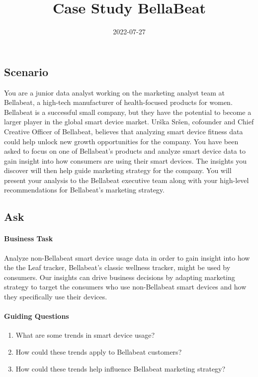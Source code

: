 \documentclass[
]{article}
\title{Case Study BellaBeat}
\author{}
\date{\vspace{-2.5em}2022-07-27}
\providecommand{\tightlist}{%
  \setlength{\itemsep}{0pt}\setlength{\parskip}{0pt}}
\begin{document}
\maketitle

\hypertarget{scenario}{%
\subsection{Scenario}\label{scenario}}

You are a junior data analyst working on the marketing analyst team at
Bellabeat, a high-tech manufacturer of health-focused products for
women. Bellabeat is a successful small company, but they have the
potential to become a larger player in the global smart device market.
Urška Sršen, cofounder and Chief Creative Officer of Bellabeat, believes
that analyzing smart device fitness data could help unlock new growth
opportunities for the company. You have been asked to focus on one of
Bellabeat's products and analyze smart device data to gain insight into
how consumers are using their smart devices. The insights you discover
will then help guide marketing strategy for the company. You will
present your analysis to the Bellabeat executive team along with your
high-level recommendations for Bellabeat's marketing strategy.

\hypertarget{ask}{%
\subsection{Ask}\label{ask}}

\hypertarget{business-task}{%
\paragraph{Business Task}\label{business-task}}

Analyze non-Bellabeat smart device usage data in order to gain insight
into how the the Leaf tracker, Bellabeat's classic wellness tracker,
might be used by consumers. Our insights can drive business decisions by
adapting marketing strategy to target the consumers who use
non-Bellabeat smart devices and how they specifically use their devices.

\hypertarget{guiding-questions}{%
\paragraph{Guiding Questions}\label{guiding-questions}}

\begin{enumerate}
\def\labelenumi{\arabic{enumi}.}
\tightlist
\item
  What are some trends in smart device usage?
\item
  How could these trends apply to Bellabeat customers?
\item
  How could these trends help influence Bellabeat marketing strategy?
\end{enumerate}
\end{document}
